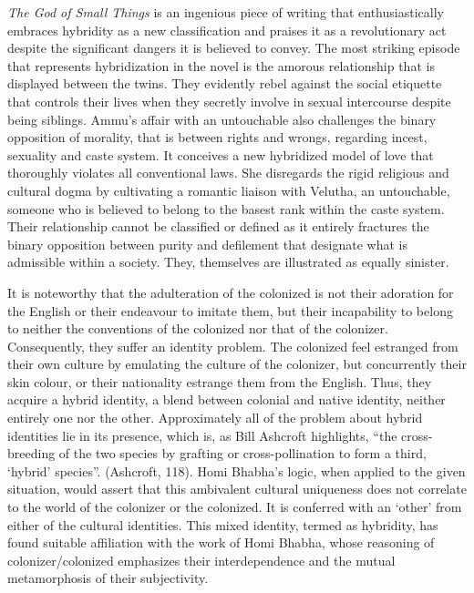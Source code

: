 \emph{The God of Small Things }is an ingenious piece of writing that enthusiastically embraces hybridity as a new classification and praises it as a revolutionary act despite the significant dangers it is believed to convey. The most striking episode that represents hybridization in the novel is the amorous relationship that is displayed between the twins. They evidently rebel against the social etiquette that controls their lives when they secretly involve in sexual intercourse despite being siblings. Ammu’s affair with an untouchable also challenges the binary opposition of morality, that is between rights and wrongs, regarding incest, sexuality and caste system. It conceives a new hybridized model of love that thoroughly violates all conventional laws. She disregards the rigid religious and cultural dogma by cultivating a romantic liaison with Velutha, an untouchable, someone who is believed to belong to the basest rank within the caste system. Their relationship cannot be classified or defined as it entirely fractures the binary opposition between purity and defilement that designate what is admissible within a society. They, themselves are illustrated as equally sinister. 

It is noteworthy that the adulteration of the colonized is not their adoration for the English or their endeavour to imitate them, but their incapability to belong to neither the conventions of the colonized nor that of the colonizer. Consequently, they suffer an identity problem. The colonized feel estranged from their own culture by emulating the culture of the colonizer, but concurrently their skin colour, or their nationality estrange them from the English. Thus, they acquire a hybrid identity, a blend between colonial and native identity, neither entirely one nor the other. Approximately all of the problem about hybrid identities lie in its presence, which is, as Bill Ashcroft highlights, “the cross-breeding of the two species by grafting or cross-pollination to form a third, ‘hybrid’ species”. (Ashcroft, 118). Homi Bhabha’s logic, when applied to the given situation, would assert that this ambivalent cultural uniqueness does not correlate to the world of the colonizer or the colonized. It is conferred with an ‘other’ from either of the cultural identities. This mixed identity, termed as hybridity, has found suitable affiliation with the work of Homi Bhabha, whose reasoning of colonizer/colonized emphasizes their interdependence and the mutual metamorphosis of their subjectivity. 

